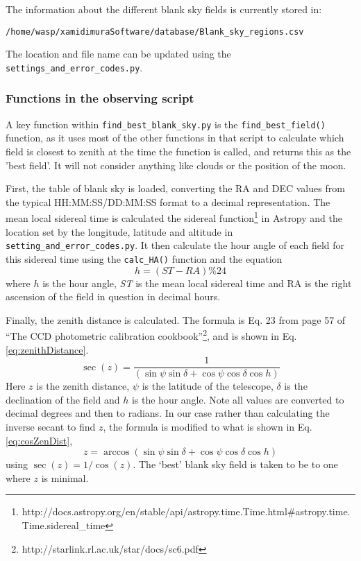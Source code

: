 \documentclass[a4paper,12pt]{article}
\begin{document}
{The information about the different blank sky fields is currently stored in: 
\begin{verbatim}
/home/wasp/xamidimuraSoftware/database/Blank_sky_regions.csv
\end{verbatim}
The location and file name can be updated using the {\tt settings\_and\_error\_codes.py}.

\subsubsection{Functions in the observing script}
\label{importedFunc}

A key function within {\tt find\_best\_blank\_sky.py} is the {\tt find\_best\_field()} function, as it uses most of the other functions in that script to calculate which field is closest to zenith at the time the function is called, and returns this as the 'best field'. It will not consider anything like clouds or the position of the moon.

First, the table of blank sky is loaded, converting the RA and DEC values from the typical HH:MM:SS/DD:MM:SS format to a decimal representation. The mean local sidereal time is calculated the sidereal function{\footnote{http://docs.astropy.org/en/stable/api/astropy.time.Time.html\#astropy.time.\\ \indent\indent Time.sidereal\_time}} in Astropy and the location set by the longitude, latitude and altitude in {\tt setting\_and\_error\_codes.py}. It then calculate the hour angle of each field for this sidereal time using the {\tt calc\_HA()} function and the equation 
\begin{equation}
h = (ST - RA) \% 24
\label{eq:HA}
\end{equation}
where $h$ is the hour angle, {\em ST} is the mean local sidereal time and {\rm RA} is the right ascension of the field in question in decimal hours. 

Finally, the zenith distance is calculated. The formula is Eq. 23 from page 57 of ``The CCD photometric calibration cookbook''{\footnote{http://starlink.rl.ac.uk/star/docs/sc6.pdf}}, and is shown in Eq. \ref{eq:zenithDistance}.
\begin{equation}
\sec(z) = \frac{1}{(\sin\psi \sin \delta + \cos \psi \cos \delta \cos h)}
\label{eq:zenithDistance}
\end{equation}
Here $z$ is the zenith distance, $\psi$ is the latitude of the telescope, $\delta$ is the declination of the field and $h$ is the hour angle. Note all values are converted to decimal degrees and then to radians. In our case rather than calculating the inverse secant to find $z$, the formula is modified to what is shown in Eq. \ref{eq:cosZenDist},
\begin{equation}
\label{eq:cosZenDist}
z = \arccos{(\sin\psi \sin \delta + \cos \psi \cos \delta \cos h)}
\end{equation}
using $\sec(z) = 1/\cos(z)$. The `best' blank sky field is taken to be to one where $z$ is minimal. 

}
\end{document}
